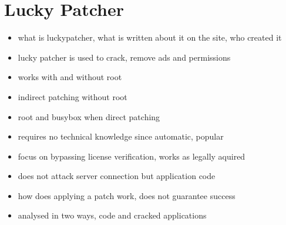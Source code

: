 \section{Lucky Patcher} \label{section:luckypatcher-explain}
\begin{itemize}
  \item what is luckypatcher, what is written about it on the site, who created it
  \item lucky patcher is used to crack, remove ads and permissions
  \item works with and without root
  \item indirect patching without root
  \item root and busybox when direct patching
  \item requires no technical knowledge since automatic, popular
  \item focus on bypassing license verification, works as legally aquired
  \item does not attack server connection but application code
  \item how does applying a patch work, does not guarantee success
  \item analysed in two ways, code and cracked applications
\end{itemize}
